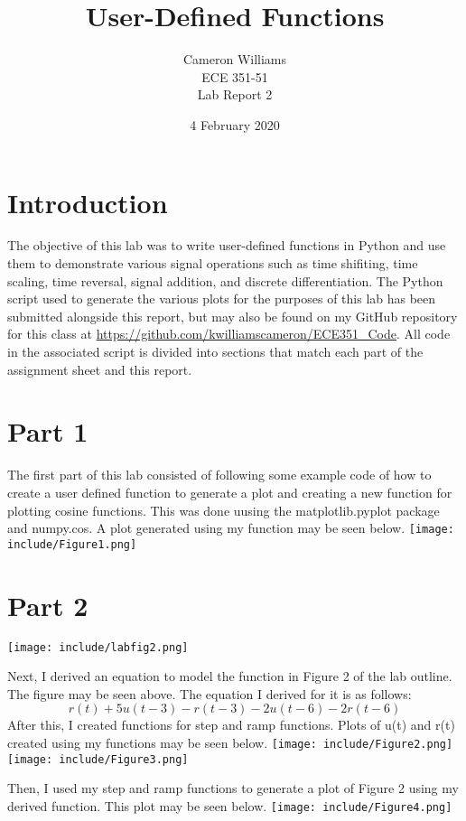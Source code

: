 \documentclass[12pt]{article}
\title{User-Defined Functions}
\author{Cameron Williams\\ECE 351-51\\Lab Report 2}
\date{4 February 2020}
\begin{document}
\vspace{\fill}
\maketitle
\vspace{\fill}
\clearpage

\newpage
\section{Introduction}
    \par The objective of this lab was to write user-defined functions in Python and use them to demonstrate various signal operations such as time shifiting, time scaling, time reversal, signal addition, and discrete differentiation. The Python script used to generate the various plots for the purposes of this lab has been submitted alongside this report, but may also be found on my GitHub repository for this class at \url{https://github.com/kwilliamscameron/ECE351_Code}. All code in the associated script is divided into sections that match each part of the assignment sheet and this report.
\section{Part 1}
    \par The first part of this lab consisted of following some example code of how to create a user defined function to generate a plot and creating a new function for plotting cosine functions. This was done uusing the matplotlib.pyplot package and numpy.cos. A plot generated using my function may be seen below.
    \newline
    \newline
    \texttt{[image: include/Figure1.png]}
    
\section{Part 2}
    \texttt{[image: include/labfig2.png]}
    \par Next, I derived an equation to model the function in Figure 2 of the lab outline. The figure may be seen above. The equation I derived for it is as follows: 
    $$r(t) + 5u(t-3) - r(t-3) - 2u(t-6) - 2r(t-6)$$ 
    After this, I created functions for step and ramp functions. Plots of u(t) and r(t) created using my functions may be seen below.
    \newline
    \newline
    \texttt{[image: include/Figure2.png]}
    \newline
    \texttt{[image: include/Figure3.png]}
    \par Then, I used my step and ramp functions to generate a plot of Figure 2 using my derived function. This plot may be seen below.
    \newline
    \newline
    \texttt{[image: include/Figure4.png]}
    
\end{document}
